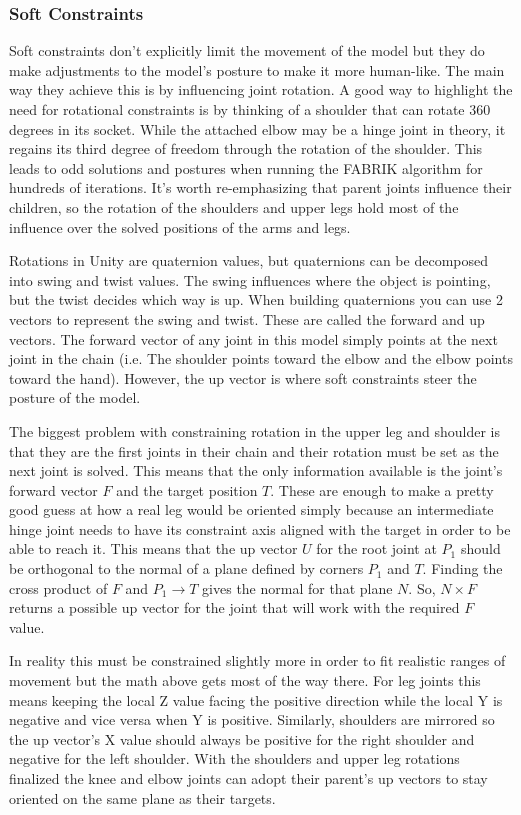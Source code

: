 \documentclass[10pt,twocolumn]{article}
\begin{document}
\subsubsection{Soft Constraints}


Soft constraints don’t explicitly limit the movement of the model but they do make adjustments to the model’s posture to make it more human-like. The main way they achieve this is by influencing joint rotation. A good way to highlight the need for rotational constraints is by thinking of a shoulder that can rotate 360 degrees in its socket. While the attached elbow may be a hinge joint in theory, it regains its third degree of freedom through the rotation of the shoulder. This leads to odd solutions and postures when running the FABRIK algorithm for hundreds of iterations. It's worth re-emphasizing that parent joints influence their children, so the rotation of the shoulders and upper legs hold most of the influence over the solved positions of the arms and legs. 

Rotations in Unity are quaternion values, but quaternions can be decomposed into swing and twist values. The swing influences where the object is pointing, but the twist decides which way is up. When building quaternions you can use 2 vectors to represent the swing and twist. These are called the forward and up vectors. The forward vector of any joint in this model simply points at the next joint in the chain (i.e. The shoulder points toward the elbow and the elbow points toward the hand). However, the up vector is where soft constraints steer the posture of the model.

The biggest problem with constraining rotation in the upper leg and shoulder is that they are the first joints in their chain and their rotation must be set as the next joint is solved. This means that the only information available is the joint’s forward vector $F$ and the target position $T$. These are enough to make a pretty good guess at how a real leg would be oriented simply because an intermediate hinge joint needs to have its constraint axis aligned with the target in order to be able to reach it. This means that the up vector $U$ for the root joint at $P_1$ should be orthogonal to the normal of a plane defined by corners $P_1$ and $T$. Finding the cross product of $F$ and $P_1  \rightarrow T$ gives the normal for that plane $N$. So, $N \times F$ returns a possible up vector for the joint that will work with the required $F$ value.

In reality this must be constrained slightly more in order to fit realistic ranges of movement but the math above gets most of the way there. For leg joints this means keeping the local Z value facing the positive direction while the local Y is negative and vice versa when Y is positive. Similarly, shoulders are mirrored so the up vector’s X value should always be positive for the right shoulder and negative for the left shoulder. With the shoulders and upper leg rotations finalized the knee and elbow joints can adopt their parent's up vectors to stay oriented on the same plane as their targets. 
\end{document}
